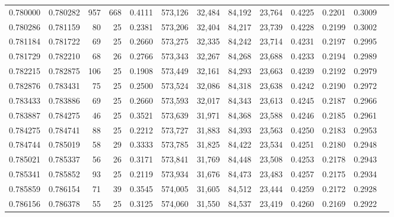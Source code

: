 \begin{tabular}{rrrrrrrrrrrrr}
0.780000 & 0.780282 &   957 & 668 &                                     0.4111 & 573,126 &  32,484 &  84,192 &  23,764 & 0.4225 & 0.2201 & 0.3009 \\
0.780286 & 0.781159 &    80 &  25 &                                     0.2381 & 573,206 &  32,404 &  84,217 &  23,739 & 0.4228 & 0.2199 & 0.3002 \\
0.781184 & 0.781722 &    69 &  25 &                                     0.2660 & 573,275 &  32,335 &  84,242 &  23,714 & 0.4231 & 0.2197 & 0.2995 \\
0.781729 & 0.782210 &    68 &  26 &                                     0.2766 & 573,343 &  32,267 &  84,268 &  23,688 & 0.4233 & 0.2194 & 0.2989 \\
0.782215 & 0.782875 &   106 &  25 &                                     0.1908 & 573,449 &  32,161 &  84,293 &  23,663 & 0.4239 & 0.2192 & 0.2979 \\
0.782876 & 0.783431 &    75 &  25 &                                     0.2500 & 573,524 &  32,086 &  84,318 &  23,638 & 0.4242 & 0.2190 & 0.2972 \\
0.783433 & 0.783886 &    69 &  25 &                                     0.2660 & 573,593 &  32,017 &  84,343 &  23,613 & 0.4245 & 0.2187 & 0.2966 \\
0.783887 & 0.784275 &    46 &  25 &                                     0.3521 & 573,639 &  31,971 &  84,368 &  23,588 & 0.4246 & 0.2185 & 0.2961 \\
0.784275 & 0.784741 &    88 &  25 &                                     0.2212 & 573,727 &  31,883 &  84,393 &  23,563 & 0.4250 & 0.2183 & 0.2953 \\
0.784744 & 0.785019 &    58 &  29 &                                     0.3333 & 573,785 &  31,825 &  84,422 &  23,534 & 0.4251 & 0.2180 & 0.2948 \\
0.785021 & 0.785337 &    56 &  26 &                                     0.3171 & 573,841 &  31,769 &  84,448 &  23,508 & 0.4253 & 0.2178 & 0.2943 \\
0.785341 & 0.785852 &    93 &  25 &                                     0.2119 & 573,934 &  31,676 &  84,473 &  23,483 & 0.4257 & 0.2175 & 0.2934 \\
0.785859 & 0.786154 &    71 &  39 &                                     0.3545 & 574,005 &  31,605 &  84,512 &  23,444 & 0.4259 & 0.2172 & 0.2928 \\
0.786156 & 0.786378 &    55 &  25 &                                     0.3125 & 574,060 &  31,550 &  84,537 &  23,419 & 0.4260 & 0.2169 & 0.2922 \\

\end{tabular}
